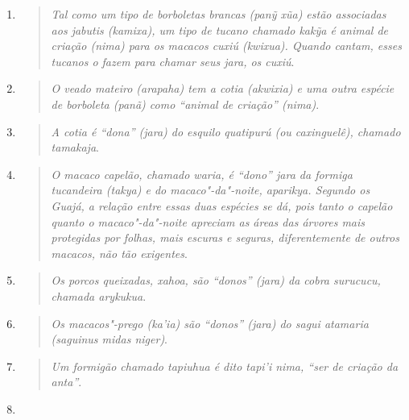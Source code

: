 \begin{enumerate}
\def\labelenumi{\arabic{enumi}.}
\item
  \begin{quote}
  \emph{Tal como um tipo de borboletas brancas (\emph{panỹ xũa}) estão
    associadas aos jabutis (\emph{kamixa}), um tipo de tucano chamado
    \emph{kakỹa} é animal de criação (\emph{nima}) para os macacos cuxiú
    (\emph{kwixua}). Quando cantam, esses tucanos o fazem para chamar seus
    \emph{jara}, os cuxiú}.
  \end{quote}
\item
  \begin{quote}
  \emph{O veado mateiro (\emph{arapaha}) tem a cotia (\emph{akwixia}) e uma
    outra espécie de borboleta (\emph{panã}) como ``animal de criação''
    (\emph{nima})}.
  \end{quote}
\item
  \begin{quote}
  \emph{A cotia é ``dona'' (\emph{jara}) do esquilo quatipurú (ou caxinguelê),
    chamado \emph{tamakaja}}.
  \end{quote}
\item
  \begin{quote}
  \emph{O macaco capelão, chamado \emph{waria}, é ``dono'' \emph{jara} da
    formiga tucandeira (\emph{takya}) e do macaco"-da"-noite,
    \emph{aparikya}. Segundo os Guajá, a relação entre essas duas espécies
    se dá, pois tanto o capelão quanto o macaco"-da"-noite apreciam as áreas
    das árvores mais protegidas por folhas, mais escuras e seguras,
    diferentemente de outros macacos, não tão exigentes}.
  \end{quote}
\item
  \begin{quote}
  \emph{Os porcos queixadas, \emph{xahoa}, são ``donos'' (\emph{jara}) da
    cobra surucucu, chamada \emph{arykukua}}.
  \end{quote}
\item
  \begin{quote}
  \emph{Os macacos"-prego (\emph{ka'ia}) são ``donos'' (\emph{jara}) do sagui
    \emph{atamaria} (\emph{saguinus} \emph{midas} \emph{niger})}.
  \end{quote}
\item
\begin{quote}
  \emph{Um formigão chamado \emph{tapiuhua} é dito \emph{tapi'i} \emph{nima},
    ``ser de criação da anta''}.
\end{quote}
\item

\end{enumerate}
